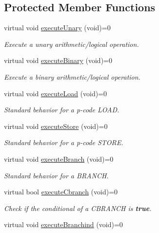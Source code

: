 \subsection*{Protected Member Functions}
\begin{DoxyCompactItemize}
\item 
virtual void \mbox{\hyperlink{class_emulate_a95111238fb3061b23db2e94ec280b34f}{execute\+Unary}} (void)=0
\begin{DoxyCompactList}\small\item\em Execute a unary arithmetic/logical operation. \end{DoxyCompactList}\item 
virtual void \mbox{\hyperlink{class_emulate_a278171740465666a64442716187a1505}{execute\+Binary}} (void)=0
\begin{DoxyCompactList}\small\item\em Execute a binary arithmetic/logical operation. \end{DoxyCompactList}\item 
virtual void \mbox{\hyperlink{class_emulate_acc9c4d2ddbfe4ff639e320d30a212e56}{execute\+Load}} (void)=0
\begin{DoxyCompactList}\small\item\em Standard behavior for a p-\/code L\+O\+AD. \end{DoxyCompactList}\item 
virtual void \mbox{\hyperlink{class_emulate_a634f0261bf49be73e7d31a2baf9f6e4d}{execute\+Store}} (void)=0
\begin{DoxyCompactList}\small\item\em Standard behavior for a p-\/code S\+T\+O\+RE. \end{DoxyCompactList}\item 
virtual void \mbox{\hyperlink{class_emulate_a145cee350a9273250a970c9387ecbd81}{execute\+Branch}} (void)=0
\begin{DoxyCompactList}\small\item\em Standard behavior for a B\+R\+A\+N\+CH. \end{DoxyCompactList}\item 
virtual bool \mbox{\hyperlink{class_emulate_ac0dbab7129d69471d8400a75c0c7c1b5}{execute\+Cbranch}} (void)=0
\begin{DoxyCompactList}\small\item\em Check if the conditional of a C\+B\+R\+A\+N\+CH is {\bfseries{true}}. \end{DoxyCompactList}\item 
virtual void \mbox{\hyperlink{class_emulate_a9b2a5e6e6328d22c6143a5ca7d3ce4e4}{execute\+Branchind}} (void)=0

\end{DoxyCompactItemize}
